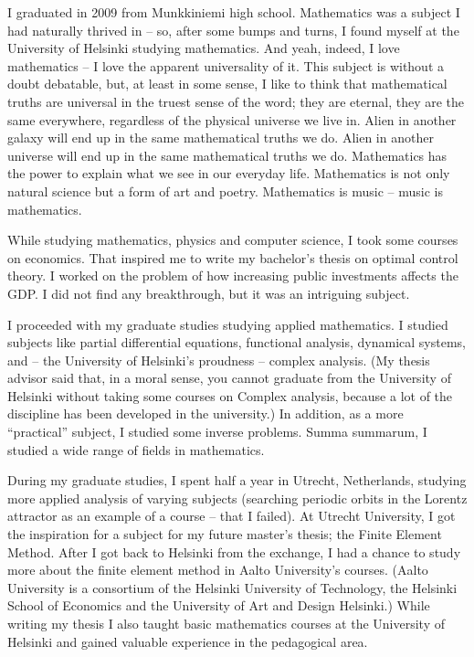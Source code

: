 \documentclass{article}
\begin{document}
        \parbox{\textwidth} {

          I graduated in 2009 from Munkkiniemi high school. Mathematics was a subject I had naturally thrived in -- so, after some bumps and turns,  I found myself at the University of Helsinki studying mathematics. And yeah, indeed, I love mathematics -- I love the apparent universality of it. This subject is without a doubt debatable, but, at least in some sense, I like to think that mathematical truths are universal in the truest sense of the word; they are eternal, they are the same everywhere, regardless of the physical universe we live in. Alien in another galaxy will end up in the same mathematical truths we do. Alien in another universe will end up in the same mathematical truths we do. Mathematics has the power to explain what we see in our everyday life. Mathematics is not only natural science but a form of art and poetry. Mathematics is music -- music is mathematics.

          While studying mathematics, physics and computer science, I took some courses on economics. That inspired me to write my bachelor's thesis on optimal control theory. I worked on the problem of how increasing public investments affects the GDP. I did not find any breakthrough, but it was an intriguing subject.

          I proceeded with my graduate studies studying applied mathematics. I studied subjects like partial differential equations, functional analysis, dynamical systems, and  -- the University of Helsinki's proudness -- complex analysis. (My thesis advisor said that, in a moral sense, you cannot graduate from the University of Helsinki without taking some courses on Complex analysis, because a lot of the discipline has been developed in the university.) In addition, as a more ``practical'' subject, I studied some inverse problems. Summa summarum, I studied a wide range of fields in mathematics.

          During my graduate studies, I spent half a year in Utrecht, Netherlands, studying more applied analysis of varying subjects (searching periodic orbits in the Lorentz attractor as an example of a course -- that I failed). At Utrecht University, I got the inspiration for a subject for my future master's thesis; the Finite Element Method. After I got back to Helsinki from the exchange, I had a chance to study more about the finite element method in Aalto University's courses. (Aalto University is a consortium of the Helsinki University of Technology, the Helsinki School of Economics and the University of Art and Design Helsinki.) While writing my thesis I also taught basic mathematics courses at the University of Helsinki and gained valuable experience in the pedagogical area.

}
\end{document}

